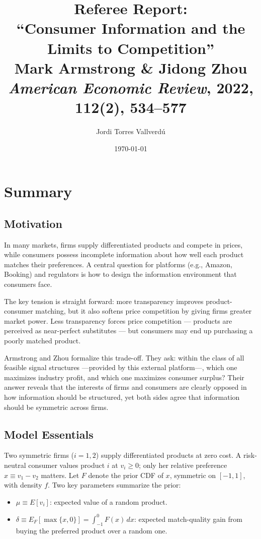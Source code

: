 \documentclass[12pt, a4paper]{article}
\title{\textbf{Referee Report: \\ ``Consumer Information and the Limits to Competition''} \\[6pt]
\large Mark Armstrong \& Jidong Zhou \\
\textit{American Economic Review}, 2022, 112(2), 534--577}
\author{Jordi Torres Vallverd\'{u}}
\date{\today}
\begin{document}
\maketitle
\thispagestyle{empty}

\section{Summary}

\subsection{Motivation}

In many markets, firms supply differentiated products and compete in prices, while consumers possess incomplete information about how well each product matches their preferences. A central question for platforms (e.g., Amazon, Booking) and regulators is how to design the information environment that consumers face.

The key tension is straight forward: more transparency improves product-consumer matching, but it also softens price competition by giving firms greater market power. Less transparency forces price competition --- products are perceived as near-perfect substitutes --- but consumers may end up purchasing a poorly matched product.

Armstrong and Zhou formalize this trade-off. They ask: within the class of all feasible signal structures ---provided by this external platform---, which one maximizes industry profit, and which one maximizes consumer surplus? Their answer reveals that the interests of firms and consumers are clearly opposed in how information should be structured, yet both sides agree that information should be symmetric across firms.

\subsection{Model Essentials}

Two symmetric firms ($i = 1,2$) supply differentiated products at zero cost. A risk-neutral consumer values product $i$ at $v_i \geq 0$; only her relative preference $x \equiv v_1 - v_2$ matters. Let $F$ denote the prior CDF of $x$, symmetric on $[-1,1]$, with density $f$. Two key parameters summarize the prior:
\begin{itemize}[nosep]
    \item $\mu \equiv E[v_i]$: expected value of a random product.
    \item $\delta \equiv E_F[\max\{x,0\}] = \int_{-1}^{0} F(x)\,dx$: expected match-quality gain from buying the preferred product over a random one.
\end{itemize}
\end{document}
